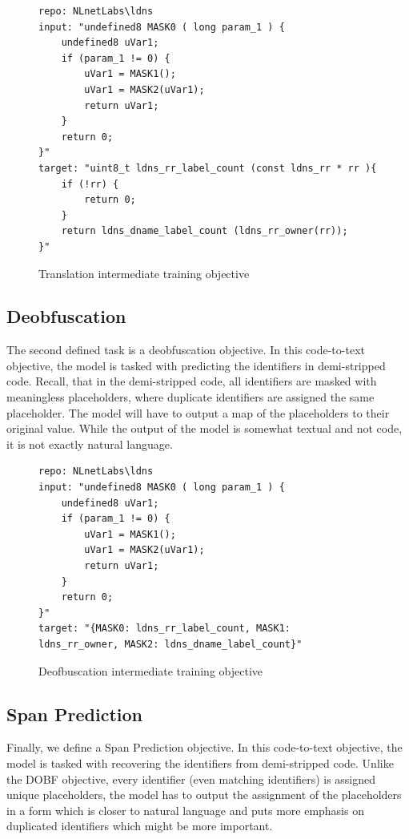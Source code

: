 \label{fig:tanslation}
\begin{figure}[H]
  \centering
\begin{lstlisting}
repo: NLnetLabs\ldns
input: "undefined8 MASK0 ( long param_1 ) { 
    undefined8 uVar1; 
    if (param_1 != 0) { 
        uVar1 = MASK1(); 
        uVar1 = MASK2(uVar1); 
        return uVar1; 
    } 
    return 0; 
}"
target: "uint8_t ldns_rr_label_count (const ldns_rr * rr ){ 
    if (!rr) { 
        return 0;
    } 
    return ldns_dname_label_count (ldns_rr_owner(rr));
}"
\end{lstlisting}
  \caption{Translation intermediate training objective}
\end{figure}

\subsection{Deobfuscation}
The second defined task is a deobfuscation objective. In this code-to-text objective, the model is tasked with predicting the identifiers in demi-stripped code. Recall, that in the demi-stripped code, all identifiers are masked with meaningless placeholders, where duplicate identifiers are assigned the same placeholder. The model will have to output a map of the placeholders to their original value. While the output of the model is somewhat textual and not code, it is not exactly natural language.

\label{fig:dobf}
\begin{figure}[H]
  \centering
\begin{lstlisting}
repo: NLnetLabs\ldns
input: "undefined8 MASK0 ( long param_1 ) { 
    undefined8 uVar1; 
    if (param_1 != 0) { 
        uVar1 = MASK1(); 
        uVar1 = MASK2(uVar1); 
        return uVar1; 
    } 
    return 0; 
}"
target: "{MASK0: ldns_rr_label_count, MASK1:
ldns_rr_owner, MASK2: ldns_dname_label_count}"
\end{lstlisting}
  \caption{Deofbuscation intermediate training objective}
\end{figure}


\subsection{Span Prediction}
Finally, we define a Span Prediction objective. In this code-to-text objective, the model is tasked with recovering the identifiers from demi-stripped code. Unlike the DOBF objective, every identifier (even matching identifiers) is assigned unique placeholders, the model has to output the assignment of the placeholders in a form which is closer to natural language and puts more emphasis on duplicated identifiers which might be more important.

